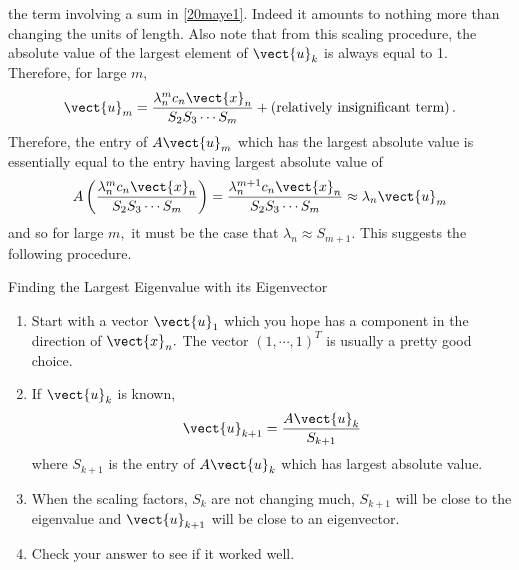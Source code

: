 the term involving a sum in \ref{20maye1}. Indeed it amounts to nothing more
than changing the units of length. Also note that from this scaling
procedure, the absolute value of the largest element of $\vect{u}_{k}$ is
always equal to 1. Therefore, for large $m,$
\begin{equation*}
\vect{u}_{m}=\vspace{0.05in}\frac{\lambda _{n}^{m}c_{n}\vect{x}_{n}}{S_{2}S_{3}\cdots S_{m}}+\left( \text{relatively insignificant term}\right) .
\end{equation*}
Therefore, the entry of $A\vect{u}_{m}$ which has the largest absolute value
is essentially equal to the entry having largest absolute value of 
\begin{equation*}
A\left( \vspace{0.05in}\frac{\lambda _{n}^{m}c_{n}\vect{x}_{n}}{S_{2}S_{3}\cdots S_{m}}\right) =\vspace{0.05in}\frac{\lambda _{n}^{m+1}c_{n}
\vect{x}_{n}}{S_{2}S_{3}\cdots S_{m}}\approx \lambda _{n}\vect{u}_{m}
\end{equation*}%
and so for large $m,$ it must be the case that $\lambda _{n}\approx S_{m+1}.$
This suggests the following procedure.

\begin{procedure}{Finding the Largest Eigenvalue with its Eigenvector}{}
\begin{enumerate}
\item Start with a vector $\vect{u}_{1}$ which you hope has a component in
the direction of $\vect{x}_{n}.$ The vector $\left( 1,\cdots ,1\right) ^{T}$
is usually a pretty good choice.

\item If $\vect{u}_{k}$ is known, 
\begin{equation*}
\vect{u}_{k+1}=\frac{A\vect{u}_{k}}{S_{k+1}}
\end{equation*}
where $S_{k+1}$ is the entry of $A\vect{u}_{k}$ which has largest absolute
value.

\item When the scaling factors, $S_{k}$ are not changing much, $S_{k+1}$
will be close to the eigenvalue and $\vect{u}_{k+1}$ will be close to an
eigenvector.

\item Check your answer to see if it worked well.
\end{enumerate}
\end{procedure}

